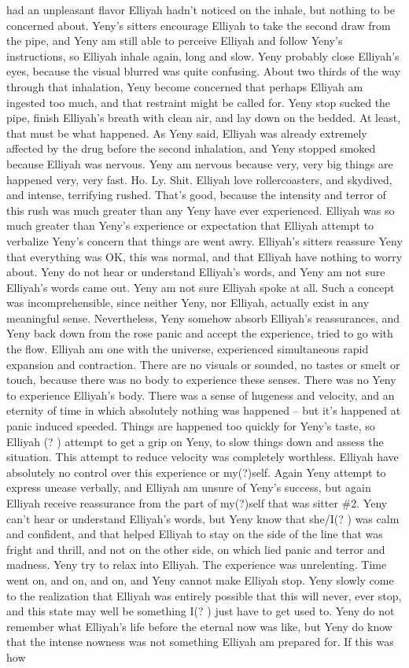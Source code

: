 \documentclass[12pt]{book}
\begin{document}
had an unpleasant flavor Elliyah hadn't noticed on the inhale, but nothing to be concerned about. Yeny's sitters encourage Elliyah to take the second draw from the pipe, and Yeny am still able to perceive Elliyah and follow Yeny's instructions, so Elliyah inhale again, long and slow. Yeny probably close Elliyah's eyes, because the visual blurred was quite confusing. About two thirds of the way through that inhalation, Yeny become concerned that perhaps Elliyah am ingested too much, and that restraint might be called for. Yeny stop sucked the pipe, finish Elliyah's breath with clean air, and lay down on the bedded. At least, that must be what happened. As Yeny said, Elliyah was already extremely affected by the drug before the second inhalation, and Yeny stopped smoked because Elliyah was nervous. Yeny am nervous because very, very big things are happened very, very fast. Ho. Ly. Shit. Elliyah love rollercoasters, and skydived, and intense, terrifying rushed. That's good, because the intensity and terror of this rush was much greater than any Yeny have ever experienced. Elliyah was so much greater than Yeny's experience or expectation that Elliyah attempt to verbalize Yeny's concern that things are went awry. Elliyah's sitters reassure Yeny that everything was OK, this was normal, and that Elliyah have nothing to worry about. Yeny do not hear or understand Elliyah's words, and Yeny am not sure Elliyah's words came out. Yeny am not sure Elliyah spoke at all. Such a concept was incomprehensible, since neither Yeny, nor Elliyah, actually exist in any meaningful sense. Nevertheless, Yeny somehow absorb Elliyah's reassurances, and Yeny back down from the rose panic and accept the experience, tried to go with the flow. Elliyah am one with the universe, experienced simultaneous rapid expansion and contraction. There are no visuals or sounded, no tastes or smelt or touch, because there was no body to experience these senses. There was no Yeny to experience Elliyah's body. There was a sense of hugeness and velocity, and an eternity of time in which absolutely nothing was happened -- but it's happened at panic induced speeded. Things are happened too quickly for Yeny's taste, so Elliyah (? ) attempt to get a grip on Yeny, to slow things down and assess the situation. This attempt to reduce velocity was completely worthless. Elliyah have absolutely no control over this experience or my(?)self. Again Yeny attempt to express unease verbally, and Elliyah am unsure of Yeny's success, but again Elliyah receive reassurance from the part of my(?)self that was sitter \#2. Yeny can't hear or understand Elliyah's words, but Yeny know that she/I(? ) was calm and confident, and that helped Elliyah to stay on the side of the line that was fright and thrill, and not on the other side, on which lied panic and terror and madness. Yeny try to relax into Elliyah. The experience was unrelenting. Time went on, and on, and on, and Yeny cannot make Elliyah stop. Yeny slowly come to the realization that Elliyah was entirely possible that this will never, ever stop, and this state may well be something I(? ) just have to get used to. Yeny do not remember what Elliyah's life before the eternal now was like, but Yeny do know that the intense nowness was not something Elliyah am prepared for. If this was how 
\end{document}
